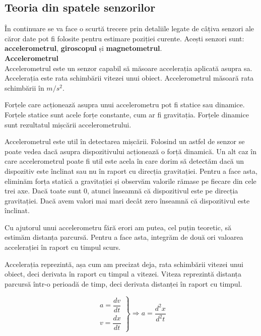\documentclass[12pt,a4paper]{article}
\begin{document}
\newpage
\subsection{Teoria din spatele senzorilor}
În continuare se va face o scurtă trecere prin detaliile legate de câțiva senzori ale căror date pot fi folosite pentru estimare poziției curente. Acești senzori sunt: \textbf{accelerometrul}, \textbf{giroscopul} și \textbf{magnetometrul}.\\

\textbf{Accelerometrul}\\
Accelerometrul este un senzor capabil să măsoare accelerația aplicată asupra sa. Accelerația este rata schimbării vitezei unui obiect. Accelerometrul măsoară rata schimbării în $m/s^{2}$.

Forțele care acționează asupra unui accelerometru pot fi statice sau dinamice. Forțele statice sunt acele forțe constante, cum ar fi gravitația. Forțele dinamice sunt rezultatul mișcării accelerometrului.

Accelerometrul este util în detectarea mișcării. Folosind un astfel de senzor se poate vedea dacă asupra dispozitivului acționează o forță dinamică. Un alt caz în care accelerometrul poate fi util este acela în care dorim să detectăm dacă un dispozitiv este înclinat sau nu în raport cu direcția gravitației. Pentru a face asta, eliminăm forța statică a gravitației și observăm valorile rămase pe fiecare din cele trei axe. Dacă toate sunt 0, atunci înseamnă că dispozitivul este pe direcția gravitației. Dacă avem valori mai mari decât zero înseamnă că dispozitivul este înclinat.

Cu ajutorul unui accelerometru fără erori am putea, cel puțin teoretic, să estimăm distanța parcursă. Pentru a face asta, integrăm de două ori valoarea accelerației în raport cu timpul scurs.

Accelerația reprezintă, așa cum am precizat deja, rata schimbării vitezei unui obiect, deci derivata în raport cu timpul a vitezei. Viteza reprezintă distanța parcursă într-o perioadă de timp, deci derivata distanței în raport cu timpul.

\begin{equation} 
\left.
\begin{aligned} a = \dfrac{dv}{dt}\\ v = \dfrac{dx}{dt} \end{aligned} \right\} \Rightarrow a = \dfrac{d^{2}x}{d^{2}t}
\end{equation}
\end{document}

